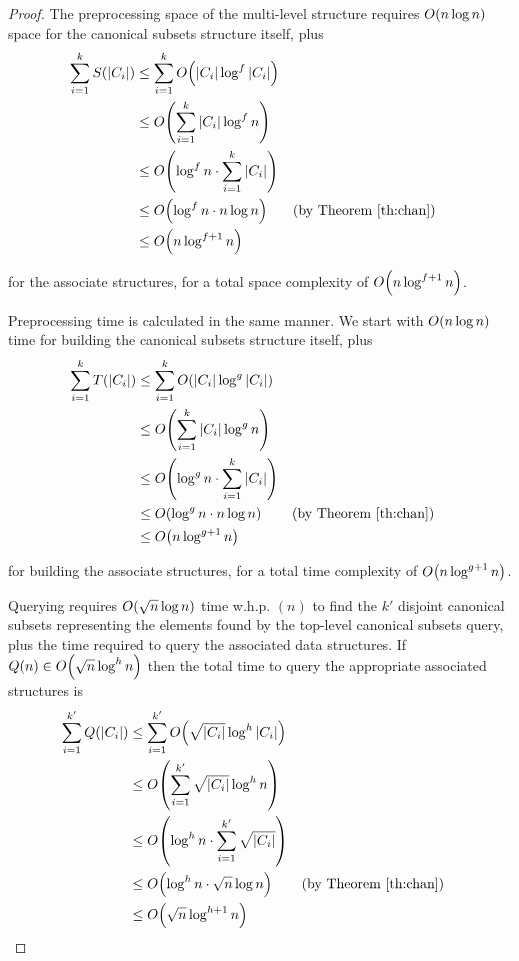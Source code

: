 \begin{proof}
The preprocessing space of the multi-level structure requires $O\!\left(n \log{n}\right)$ space for the canonical subsets structure itself, plus
\begin{align*}
\sum_{i=1}^k{S(|C_i|)}
&\leq \sum_{i=1}^k{\BigOh{|C_i| \log^f{|C_i|}}} \\
%
&\leq \BigOh{\sum_{i=1}^k{|C_i| \log^f{n}}} \\
%
&\leq \BigOh{\log^f{n} \cdot \sum_{i=1}^k{|C_i|}} \\
%
&\leq \BigOh{\log^f{n} \cdot n \log{n}} && \text{(by Theorem \ref{th:chan})}\\
%
&\leq \BigOh{n\log^{f+1}{n}} \\
\end{align*}

\noindent for the associate structures, for a total space complexity of $O\!\left(n\log^{f+1}{n}\right)$.

Preprocessing time is calculated in the same manner. 
We start with $O\!\left(n \log{n}\right)$ time for building the canonical subsets structure itself, plus
\begin{align*}
\sum_{i=1}^k{T(|C_i|)}
&\leq \sum_{i=1}^k{\BigOh{|C_i| \log^g{|C_i|}}} \\
%
&\leq \BigOh{\sum_{i=1}^k{|C_i| \log^g{n}}} \\
%
&\leq \BigOh{\log^g{n} \cdot \sum_{i=1}^k{|C_i|}} \\
%
&\leq \BigOh{\log^g{n} \cdot n \log{n}} && \text{(by Theorem \ref{th:chan})} \\
%
&\leq \BigOh{n\log^{g+1}{n}} \\
\end{align*}

\noindent for building the associate structures, for a total time complexity of $O\!\left(n\log^{g+1}{n}\right)$.

Querying requires $O\!\left(\sqrt{n}\log{n}\right)$ time w.h.p. $(n)$ to find the $k'$ disjoint canonical subsets representing the elements found by the top-level canonical subsets query, plus the time required to query the associated data structures.  
If $Q(n) \in O\!\left(\sqrt{n}\log^h{n}\right)$ then the total time to query the appropriate associated structures is
\begin{align*}
\sum_{i=1}^{k'}{Q(|C_i|)}
&\leq \sum_{i=1}^{k'}{\BigOh{\sqrt{|C_i|}\log^h{|C_i|}}} \\
%
&\leq \BigOh{\sum_{i=1}^{k'}{\sqrt{|C_i|}\log^h{n}}} \\
%
&\leq \BigOh{\log^h{n} \cdot \sum_{i=1}^{k'}{\sqrt{|C_i|}}} \\
%
&\leq \BigOh{\log^h{n} \cdot \sqrt{n}\log{n}}  && \text{(by Theorem \ref{th:chan})} \\
%
&\leq \BigOh{\sqrt{n}\log^{h+1}{n}} \\
\end{align*}


\end{proof}
